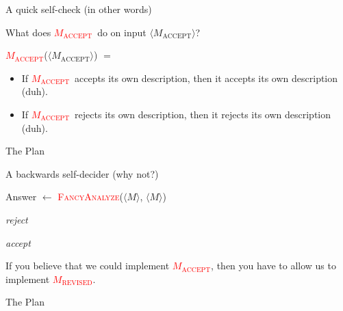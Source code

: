 \documentclass[12pt,compress]{beamer}
\newcommand{\func}[1]{\textcolor{red}{\textsc{#1}}}
\newcommand{\str}[1]{$\langle #1 \rangle$}
\newcommand{\MACC}[0]{\func{$M_{\text{ACCEPT}}$}}
\newcommand{\MREV}[0]{\func{$M_{\text{REVISED}}$}}
\newcommand{\strMACC}[0]{$\langle M_{\text{ACCEPT}} \rangle$}
\begin{document}
\begin{frame}{A quick self-check (in other words)}

  What does \MACC~do on input \strMACC?

  \vskip 0.25in

  \MACC(\strMACC) $=$

  \begin{itemize}

  \item If \MACC~accepts its own description, then it
    accepts its own description (duh).

  \item If \MACC~rejects its own description, then it
    rejects its own description (duh).

  \end{itemize}

\end{frame}

\begin{frame}{The Plan}

  

\end{frame}

\begin{frame}{A backwards self-decider (why not?)}

  \begin{algorithmic}[0]
    \Function{\MREV}{\str{M}}

    \State Answer $\gets$ \func{FancyAnalyze}(\str{M}, \str{M})


    \Return \textit{reject} \Comment{\textcolor{blue}{opposite!}}


    \Return \textit{accept} \Comment{\textcolor{blue}{opposite!}}

    \EndIf

    \EndFunction
    
  \end{algorithmic}

  If you believe that we could implement \MACC, then you
  have to allow us to implement \MREV.

\end{frame}

\begin{frame}{The Plan}

  

\end{frame}
\end{document}
